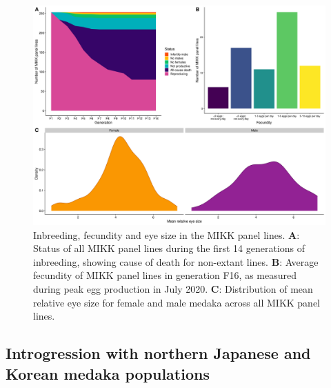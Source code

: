 \documentclass[
]{book}
\begin{document}
\begin{figure}
\includegraphics[width=1\linewidth]{figs/mikk_genome/20211213_final_figure} \caption{Inbreeding, fecundity and eye size in the MIKK panel lines. \textbf{A}: Status of all MIKK panel lines during the first 14 generations of inbreeding, showing cause of death for non-extant lines. \textbf{B}: Average fecundity of MIKK panel lines in generation F16, as measured during peak egg production in July 2020. \textbf{C}: Distribution of mean relative eye size for female and male medaka across all MIKK panel lines.}\label{fig:InbreedingFigure}
\end{figure}

\hypertarget{introgression-sec}{%
\subsection{Introgression with northern Japanese and Korean medaka populations}\label{introgression-sec}}
\end{document}
